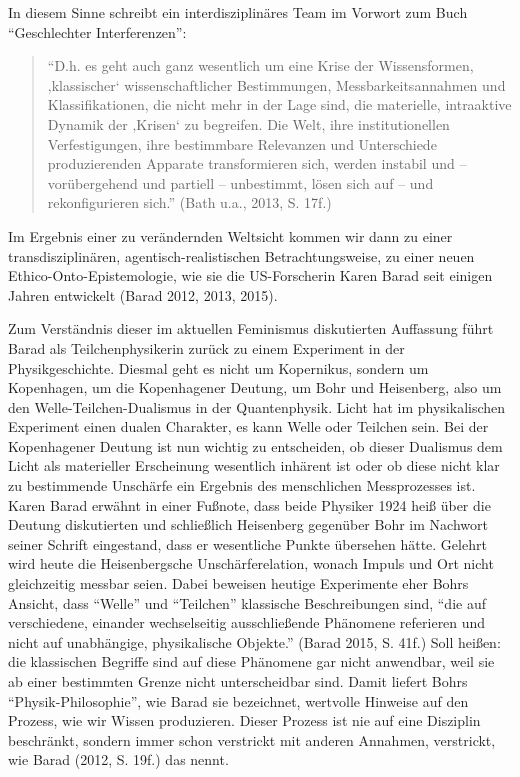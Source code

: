 In diesem Sinne schreibt ein interdisziplinäres Team im Vorwort zum Buch
\enquote{Geschlechter Interferenzen}:

\begin{quote}
\enquote{D.h. es geht auch ganz wesentlich um eine Krise der
Wissensformen, ‚klassischer` wissenschaftlicher Bestimmungen,
Messbarkeitsannahmen und Klassifikationen, die nicht mehr in der Lage
sind, die materielle, intraaktive Dynamik der ‚Krisen` zu begreifen. Die
Welt, ihre institutionellen Verfestigungen, ihre bestimmbare Relevanzen
und Unterschiede produzierenden Apparate transformieren sich, werden
instabil und -- vorübergehend und partiell -- unbestimmt, lösen sich auf
-- und rekonfigurieren sich.} (Bath u.a., 2013, S. 17f.)
\end{quote}

Im Ergebnis einer zu verändernden Weltsicht kommen wir dann zu einer
transdisziplinären, agentisch-realistischen Betrachtungsweise, zu einer
neuen Ethico-Onto-Epistemologie, wie sie die US-Forscherin Karen Barad
seit einigen Jahren entwickelt (Barad 2012, 2013, 2015).

Zum Verständnis dieser im aktuellen Feminismus diskutierten Auffassung
führt Barad als Teilchenphysikerin zurück zu einem Experiment in der
Physikgeschichte. Diesmal geht es nicht um Kopernikus, sondern um
Kopenhagen, um die Kopenhagener Deutung, um Bohr und Heisenberg, also um
den Welle-Teilchen-Dualismus in der Quantenphysik. Licht hat im
physikalischen Experiment einen dualen Charakter, es kann Welle oder
Teilchen sein. Bei der Kopenhagener Deutung ist nun wichtig zu
entscheiden, ob dieser Dualismus dem Licht als materieller Erscheinung
wesentlich inhärent ist oder ob diese nicht klar zu bestimmende
Unschärfe ein Ergebnis des menschlichen Messprozesses ist. Karen Barad
erwähnt in einer Fußnote, dass beide Physiker 1924 heiß über die Deutung
diskutierten und schließlich Heisenberg gegenüber Bohr im Nachwort
seiner Schrift eingestand, dass er wesentliche Punkte übersehen hätte.
Gelehrt wird heute die Heisenbergsche Unschärferelation, wonach Impuls
und Ort nicht gleichzeitig messbar seien. Dabei beweisen heutige
Experimente eher Bohrs Ansicht, dass \enquote{Welle} und
\enquote{Teilchen} klassische Beschreibungen sind, \enquote{die auf
verschiedene, einander wechselseitig ausschließende Phänomene referieren
und nicht auf unabhängige, physikalische Objekte.} (Barad 2015, S. 41f.)
Soll heißen: die klassischen Begriffe sind auf diese Phänomene gar nicht
anwendbar, weil sie ab einer bestimmten Grenze nicht unterscheidbar
sind. Damit liefert Bohrs \enquote{Physik-Philosophie}, wie Barad sie
bezeichnet, wertvolle Hinweise auf den Prozess, wie wir Wissen
produzieren. Dieser Prozess ist nie auf eine Disziplin beschränkt,
sondern immer schon verstrickt mit anderen Annahmen, verstrickt, wie
Barad (2012, S. 19f.) das nennt.

